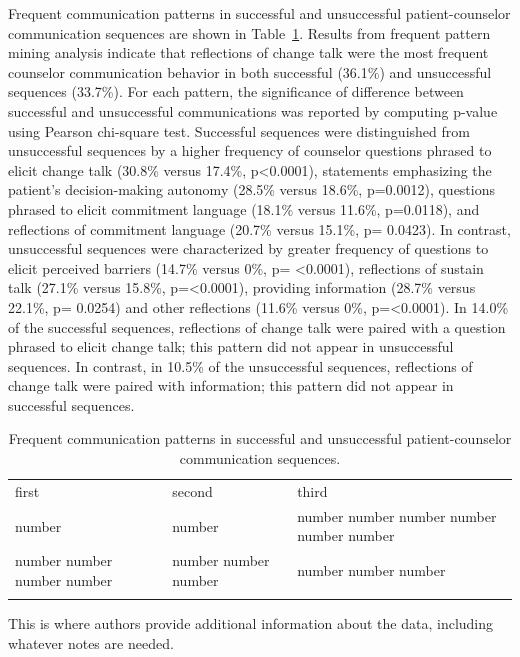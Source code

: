 Frequent communication patterns in successful and unsuccessful patient-counselor communication sequences are shown in Table~\ref{tab:patterns}. Results from frequent pattern mining analysis indicate that reflections of change talk were the most frequent counselor communication behavior in both successful (36.1\%) and unsuccessful sequences (33.7\%). For each pattern, the significance of difference between successful and unsuccessful communications was reported by computing p-value using Pearson chi-square test. Successful sequences were distinguished from unsuccessful sequences by a higher frequency of counselor questions phrased to elicit change talk (30.8\% versus 17.4\%, p<0.0001), statements emphasizing the patient’s decision-making autonomy (28.5\% versus 18.6\%, p=0.0012), questions phrased to elicit commitment language (18.1\% versus 11.6\%, p=0.0118), and reflections of commitment language (20.7\% versus 15.1\%, p= 0.0423). In contrast, unsuccessful sequences were characterized by greater frequency of questions to elicit perceived barriers (14.7\% versus 0\%, p= <0.0001), reflections of sustain talk (27.1\% versus 15.8\%, p=<0.0001), providing information (28.7\% versus 22.1\%, p= 0.0254) and other reflections (11.6\% versus 0\%, p=<0.0001). In 14.0\% of the successful sequences, reflections of change talk were paired with a question phrased to elicit change talk; this pattern did not appear in unsuccessful sequences. In contrast, in 10.5\% of the unsuccessful sequences, reflections of change talk were paired with information; this pattern did not appear in successful sequences.

\begin{table}
\begin{threeparttable}
\caption{Frequent communication patterns in successful and unsuccessful patient-counselor communication sequences.}
\label{tab:patterns}   
\begin{tabularx}{\textwidth}{lll}
\hline\noalign{\smallskip}
first & second & third  \\
\noalign{\smallskip}\hline\noalign{\smallskip}
number & number & number number number number number number \\
number number number number & number number number & number number  number \\
\noalign{\smallskip}\hline
\end{tabularx}
\begin{tablenotes}
      \small
      \item This is where authors provide additional information about the data, including whatever notes are needed.
\end{tablenotes}
\end{threeparttable}
\end{table}

